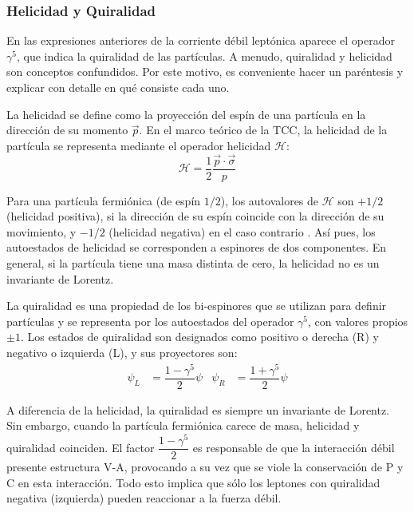 \subsubsection{Helicidad y Quiralidad}\label{sec:quirality}
En las expresiones anteriores de la corriente débil leptónica aparece el operador $\gamma^5$, que indica la quiralidad de las partículas. A menudo, quiralidad y helicidad son conceptos confundidos. Por este motivo, es conveniente hacer un paréntesis y explicar con detalle en qué consiste cada uno.

La helicidad se define como la proyección del espín de una partícula en la dirección de su momento $\vec{p}$. En el marco teórico de la TCC, la helicidad de la partícula se representa mediante el operador helicidad $\mathcal{H}$:
\begin{equation}
\mathcal{H}=\dfrac{1}{2} \dfrac{\vec{p} \cdot \vec{\sigma}}{p}
\end{equation} 

Para una partícula fermiónica (de espín $1/2$), los autovalores de $\mathcal{H}$ son $+1/2$ (helicidad positiva), si la dirección de su espín coincide con la dirección de su movimiento, y $-1/2$ (helicidad negativa) en el caso contrario \cite{Bettini}. Así pues, los autoestados de helicidad se corresponden a espinores de dos componentes. En general, si la partícula tiene una masa distinta de cero, la helicidad no es un invariante de Lorentz.

La quiralidad es una propiedad de los bi-espinores que se utilizan para definir partículas y se representa por los autoestados del operador $\gamma^5$, con valores propios $\pm 1$. Los estados de quiralidad son designados como positivo o derecha (R) y negativo o izquierda (L), y sus proyectores son:
\begin{align}
\psi_L &= \dfrac{1-\gamma^5}{2}\psi & \psi_R &= \dfrac{1+\gamma^5}{2}\psi
\end{align}

A diferencia de la helicidad, la quiralidad es siempre un invariante de Lorentz. Sin embargo, cuando la partícula fermiónica carece de masa, helicidad y quiralidad coinciden.
El factor $\dfrac{1-\gamma^5}{2}$ es responsable de que la interacción débil presente estructura V-A, provocando a su vez que se viole la conservación de P y C en esta interacción. Todo esto implica que sólo los leptones con quiralidad negativa (izquierda) pueden reaccionar a la fuerza débil.
